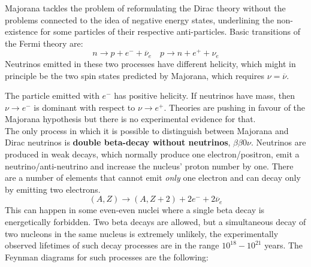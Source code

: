 \documentclass[10.75pt,a4paper,openright,bottom=2cm]{article}
\begin{document}
Majorana tackles the problem of reformulating the Dirac theory without the problems connected to the idea of negative energy states, underlining the non-existence for some particles of their respective anti-particles. Basic transitions of the Fermi theory are:
\[
n\to p+e^-+\overline{\nu}_e \quad p\to n+e^++\nu_e
\]
Neutrinos emitted in these two processes have different helicity, which might in principle be the two spin states predicted by Majorana, which requires $\nu=\overline{\nu}$.
\begin{center}
\end{center}
The particle emitted with $e^-$ has positive helicity. If neutrinos have mass, then $\nu\to e^-$ is dominant with respect to $\nu\to e^+$. Theories are pushing in favour of the Majorana hypothesis but there is no experimental evidence for that.\\
The only process in which it is possible to distinguish between Majorana and Dirac neutrinos is \textbf{double beta-decay without neutrinos}, $\beta\beta0\nu$. Neutrinos are produced in weak decays, which normally produce one electron/positron, emit a neutrino/anti-neutrino and increase the nucleus' proton number by one. There are a number of elements that cannot emit \textit{only} one electron and can decay only by emitting two electrons.
\[
(A,Z)\to(A,Z+2)+2e^-+2\overline{\nu}_e
\]
This can happen in some even-even nuclei where a single beta decay is energetically forbidden. Two beta decays are allowed, but a simultaneous decay of two nucleons in the same nucleus is extremely unlikely, the experimentally observed lifetimes of such decay processes are in the range $10^{18}-10^{21}$ years. The Feynman diagrams for such processes are the following:
\end{document}
